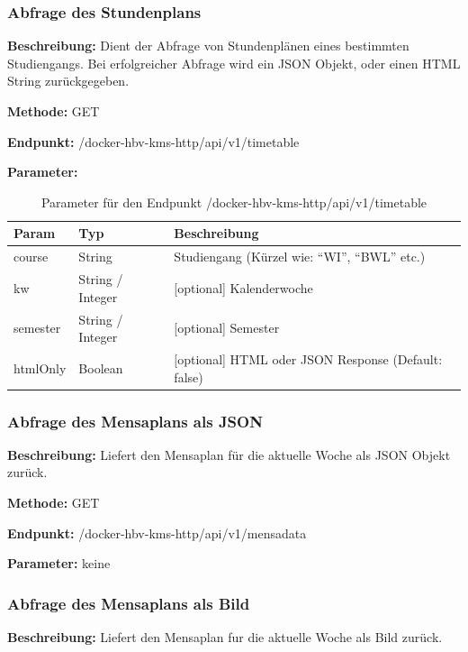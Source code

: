 \subsubsection{Abfrage des Stundenplans}
\label{sec:api-timetable}
\textbf{Beschreibung:} Dient der Abfrage von Stundenplänen eines bestimmten Studiengangs. Bei erfolgreicher Abfrage wird ein JSON Objekt, oder einen HTML String zurückgegeben.

\textbf{Methode:} GET

\textbf{Endpunkt:} /docker-hbv-kms-http/api/v1/timetable

\textbf{Parameter:}
\begin{table}[H]
    \label{table:/docker-hbv-kms-http/api/v1/timetable}
    \caption{Parameter für den Endpunkt /docker-hbv-kms-http/api/v1/timetable}
    \setlength{\tabcolsep}{3pt}
    \begin{tabular}{p{100pt}p{80pt}p{200pt}}
        \toprule
        Param    & Typ              & Beschreibung                                        \\
        \midrule
        course   & String           & Studiengang (Kürzel wie: ``WI'', ``BWL'' etc.)      \\
        kw       & String / Integer & [optional] Kalenderwoche                            \\
        semester & String / Integer & [optional] Semester                                 \\
        htmlOnly & Boolean          & [optional] HTML oder JSON Response (Default: false) \\
        \bottomrule
    \end{tabular}
\end{table}
\dotfill


\subsubsection{Abfrage des Mensaplans als JSON}
\label{sec:api-mensa-json}
\textbf{Beschreibung:} Liefert den Mensaplan für die aktuelle Woche als JSON Objekt zurück.

\textbf{Methode:} GET

\textbf{Endpunkt:} /docker-hbv-kms-http/api/v1/mensadata

\textbf{Parameter:} keine

\dotfill

\subsubsection{Abfrage des Mensaplans als Bild}
\label{sec:api-mensa-img}
\textbf{Beschreibung:} Liefert den Mensaplan fur die aktuelle Woche als Bild zurück.

